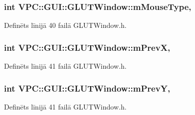 \subsubsection[{\texorpdfstring{m\+Mouse\+Type}{mMouseType}}]{\setlength{\rightskip}{0pt plus 5cm}int V\+P\+C\+::\+G\+U\+I\+::\+G\+L\+U\+T\+Window\+::m\+Mouse\+Type\hspace{0.3cm}{\ttfamily [protected]}, {\ttfamily [inherited]}}\hypertarget{class_v_p_c_1_1_g_u_i_1_1_g_l_u_t_window_abcb6dd2e6da3ff86b7d485fc439d6851}{}\label{class_v_p_c_1_1_g_u_i_1_1_g_l_u_t_window_abcb6dd2e6da3ff86b7d485fc439d6851}


Definēts līnijā 40 failā G\+L\+U\+T\+Window.\+h.

\subsubsection[{\texorpdfstring{m\+PrevX}{mPrevX}}]{\setlength{\rightskip}{0pt plus 5cm}int V\+P\+C\+::\+G\+U\+I\+::\+G\+L\+U\+T\+Window\+::m\+PrevX\hspace{0.3cm}{\ttfamily [protected]}, {\ttfamily [inherited]}}\hypertarget{class_v_p_c_1_1_g_u_i_1_1_g_l_u_t_window_afb53d32a8f4b83476cd57f7b0bdc1b1e}{}\label{class_v_p_c_1_1_g_u_i_1_1_g_l_u_t_window_afb53d32a8f4b83476cd57f7b0bdc1b1e}


Definēts līnijā 41 failā G\+L\+U\+T\+Window.\+h.

\subsubsection[{\texorpdfstring{m\+PrevY}{mPrevY}}]{\setlength{\rightskip}{0pt plus 5cm}int V\+P\+C\+::\+G\+U\+I\+::\+G\+L\+U\+T\+Window\+::m\+PrevY\hspace{0.3cm}{\ttfamily [protected]}, {\ttfamily [inherited]}}\hypertarget{class_v_p_c_1_1_g_u_i_1_1_g_l_u_t_window_a11ba670d3ec0ac9ae16f276469dcbbe8}{}\label{class_v_p_c_1_1_g_u_i_1_1_g_l_u_t_window_a11ba670d3ec0ac9ae16f276469dcbbe8}


Definēts līnijā 41 failā G\+L\+U\+T\+Window.\+h.

